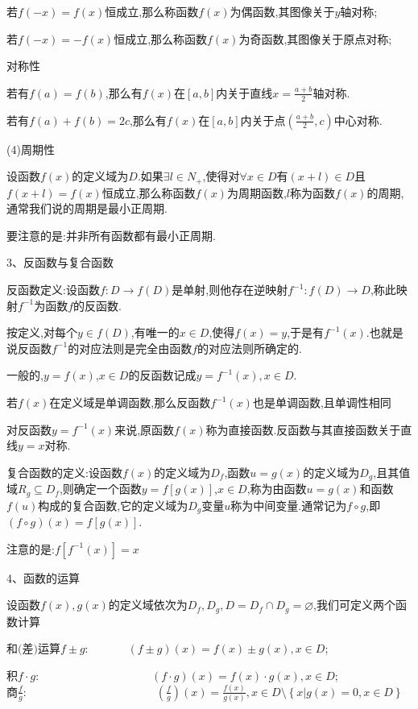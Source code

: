 \documentclass[utf8]{ctexart}
\begin{document}
若$f(-x)=f(x)$恒成立,那么称函数$f(x)$为偶函数,其图像关于$y$轴对称;

若$f(-x)=-f(x)$恒成立,那么称函数$f(x)$为奇函数,其图像关于原点对称;

对称性

若有$f(a)=f(b)$,那么有$f(x)$在$[a,b]$内关于直线$x=\displaystyle\frac{a+b}{2}$轴对称.

若有$f(a)+f(b)=2c$,那么有$f(x)$在$[a,b]$内关于点$\displaystyle(\frac{a+b}{2},c)$中心对称.

(4)周期性

设函数$f(x)$的定义域为$D$.如果$\exists l\in N_{+}$,使得对$\forall x\in D$有$(x+l)\in D$且$f(x+l)=f(x)$恒成立,那么称函数$f(x)$为周期函数,$l$称为函数$f(x)$的周期,通常我们说的周期是最小正周期.

要注意的是:并非所有函数都有最小正周期.

3、反函数与复合函数

反函数定义:设函数$f:D\to f(D)$是单射,则他存在逆映射$f^{-1}:f(D)\to D$,称此映射$f^{-1}$为函数$f$的反函数.

按定义,对每个$y\in f(D)$,有唯一的$x\in D$,使得$f(x)=y$,于是有$f^{-1}(x)$.也就是说反函数$f^{-1}$的对应法则是完全由函数$f$的对应法则所确定的.

一般的,$y=f(x)$,$x\in D$的反函数记成$y=f^{-1}(x),x\in D$.

若$f(x)$在定义域是单调函数,那么反函数$f^{-1}(x)$也是单调函数,且单调性相同

对反函数$y=f^{-1}(x)$来说,原函数$f(x)$称为直接函数.反函数与其直接函数关于直线$y=x$对称.

复合函数的定义:设函数$f(x)$的定义域为$D_{f}$,函数$u=g(x)$的定义域为$D_{g}$,且其值域$R_g\subseteq D_{f}$,则确定一个函数$y=f\left[g(x)\right]$,$x\in D$,称为由函数$u=g(x)$和函数$f(u)$构成的复合函数,它的定义域为$D_{g}$变量$u$称为中间变量.通常记为$f\circ g$,即$(f\circ g)(x)=f\left[g(x)\right]$.

注意的是:$f\left[f^{-1}(x)\right]=x$

4、函数的运算

设函数$f(x),g(x)$的定义域依次为$D_{f},D_{g},D=D_{f}\cap D_{g}=\varnothing $,我们可定义两个函数计算

和$($差$)$运算$f\pm g$:\ \ \ \ \ \ \ $(f\pm g)(x)=f(x)\pm g(x),x\in D$;

积$f\cdot g$:\ \ \ \ \ \ \ \ \ \ \ \ \ \ \ \ \ \ \ \ $(f\cdot g)(x)=f(x)\cdot g(x),x\in D$;\\

商$\displaystyle \frac{f}{g}$:\ \ \ \ \ \ \ \ \ \ \ \ \ \ \ \ \ \ \ \ \ \ \ $\displaystyle (\frac{f}{g})(x)=\frac{f(x)}{g(x)},x\in D\setminus \left\{x|g(x)=0,x\in D\right\} $\\
\end{document}
